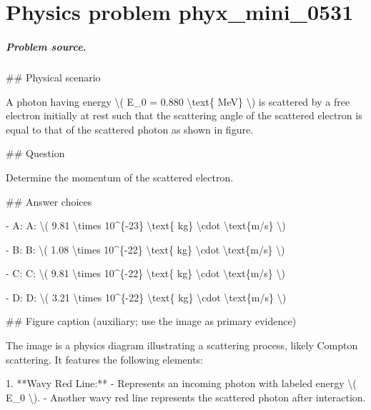 
\chapter{Physics problem phyx\_mini\_0531}
\label{ch:PhyXMiniProblems_problem_phyx_mini_0531}

\paragraph{Problem source.}
\#\# Physical scenario

A photon having energy \textbackslash{}( E\_0 = 0.880 \textbackslash{}text\{ MeV\} \textbackslash{}) is scattered by a free electron initially at rest such that the scattering angle of the scattered electron is equal to that of the scattered photon as shown in figure.

\#\# Question

Determine the momentum of the scattered electron.

\#\# Answer choices

- A: A: \textbackslash{}( 9.81 \textbackslash{}times 10\textasciicircum{}\{-23\} \textbackslash{}text\{ kg\} \textbackslash{}cdot \textbackslash{}text\{m/s\} \textbackslash{})

- B: B: \textbackslash{}( 1.08 \textbackslash{}times 10\textasciicircum{}\{-22\} \textbackslash{}text\{ kg\} \textbackslash{}cdot \textbackslash{}text\{m/s\} \textbackslash{})

- C: C: \textbackslash{}( 9.81 \textbackslash{}times 10\textasciicircum{}\{-22\} \textbackslash{}text\{ kg\} \textbackslash{}cdot \textbackslash{}text\{m/s\} \textbackslash{})

- D: D: \textbackslash{}( 3.21 \textbackslash{}times 10\textasciicircum{}\{-22\} \textbackslash{}text\{ kg\} \textbackslash{}cdot \textbackslash{}text\{m/s\} \textbackslash{})

\#\# Figure caption (auxiliary; use the image as primary evidence)

The image is a physics diagram illustrating a scattering process, likely Compton scattering. It features the following elements:

1. **Wavy Red Line:**
   - Represents an incoming photon with labeled energy \textbackslash{}( E\_0 \textbackslash{}).
   - Another wavy red line represents the scattered photon after interaction.

